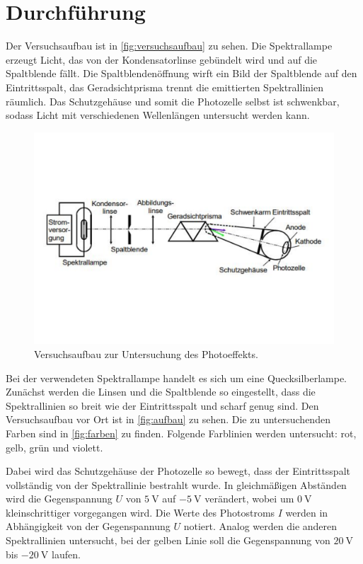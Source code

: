 \section{Durchführung}
\label{sec:Durchführung}

Der Versuchsaufbau ist in \autoref{fig:versuchsaufbau} zu sehen.
Die Spektrallampe erzeugt Licht, das von der Kondensatorlinse gebündelt wird und auf die Spaltblende fällt.
Die Spaltblendenöffnung wirft ein Bild der Spaltblende auf den Eintrittsspalt, das Geradsichtprisma trennt die emittierten Spektrallinien räumlich.
Das Schutzgehäuse und somit die Photozelle selbst ist schwenkbar, sodass Licht mit verschiedenen Wellenlängen untersucht werden kann.

\begin{figure}
    \centering
    \includegraphics[width =\textwidth]{content/versuchsaufbau.pdf}
    \caption{Versuchsaufbau zur Untersuchung des Photoeffekts.\cite{anleitung}}
    \label{fig:versuchsaufbau}
\end{figure}
\noindent
Bei der verwendeten Spektrallampe handelt es sich um eine Quecksilberlampe.
Zunächst werden die Linsen und die Spaltblende so eingestellt, dass die Spektrallinien so breit wie der Eintrittsspalt und scharf genug sind.
Den Versuchsaufbau vor Ort ist in \autoref{fig:aufbau} zu sehen.
Die zu untersuchenden Farben sind in \autoref{fig:farben} zu finden.
Folgende Farblinien werden untersucht: rot, gelb, grün und violett.

\noindent
Dabei wird das Schutzgehäuse der Photozelle so bewegt, dass der Eintrittsspalt vollständig von der Spektrallinie bestrahlt wurde.
In gleichmäßigen Abständen wird die Gegenspannung $U$ von $\SI{5}{\volt}$ auf $\SI{-5}{\volt}$ verändert, wobei um $\SI{0}{\volt}$ kleinschrittiger vorgegangen wird.
Die Werte des Photostroms $I$ werden in Abhängigkeit von der Gegenspannung $U$ notiert.
Analog werden die anderen Spektrallinien untersucht, bei der gelben Linie soll die Gegenspannung von $\SI{20}{\volt}$ bis $\SI{-20}{\volt}$ laufen.

